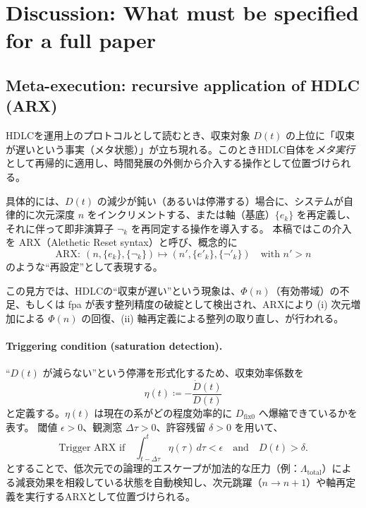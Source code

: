 \documentclass[12pt,a4paper]{article}
\newcommand{\dfix}{D_{\text{fix0}}}
\begin{document}
\section{Discussion: What must be specified for a full paper}
\subsection{Meta-execution: recursive application of HDLC (ARX)}
HDLCを運用上のプロトコルとして読むとき、収束対象 $D(t)$ の上位に「収束が遅いという事実（メタ状態）」が立ち現れる。このときHDLC自体を\emph{メタ実行}として再帰的に適用し、時間発展の外側から介入する操作として位置づけられる。

具体的には、$D(t)$ の減少が鈍い（あるいは停滞する）場合に、システムが自律的に次元深度 $n$ をインクリメントする、または軸（基底）$\{e_k\}$ を再定義し、それに伴って即非演算子 $\neg_k$ を再同定する操作を導入する。
本稿ではこの介入を ARX（Alethetic Reset syntax）と呼び、概念的に
\begin{equation}
  \mathrm{ARX}:\ (n,\{e_k\},\{\neg_k\})\mapsto (n',\{e'_k\},\{\neg'_k\})\quad \text{with } n'>n
\end{equation}
のような``再設定''として表現する。

この見方では、HDLCの``収束が遅い''という現象は、$\Phi(n)$（有効帯域）の不足、もしくは fpa が表す整列精度の破綻として検出され、ARXにより (i) 次元増加による $\Phi(n)$ の回復、(ii) 軸再定義による整列の取り直し、が行われる。

\paragraph{Triggering condition (saturation detection).}
``$D(t)$ が減らない''という停滞を形式化するため、収束効率係数を
\begin{equation}
  \eta(t) \coloneqq -\frac{\dot D(t)}{D(t)}
  \label{eq:eta}
\end{equation}
と定義する。$\eta(t)$ は現在の系がどの程度効率的に $\dfix$ へ爆縮できているかを表す。
閾値 $\epsilon>0$、観測窓 $\Delta\tau>0$、許容残留 $\delta>0$ を用いて、
\begin{equation}
  \text{Trigger ARX if}\quad \int_{t-\Delta\tau}^{t} \eta(\tau)\,d\tau < \epsilon \quad \text{and}\quad D(t)>\delta.
  \label{eq:arx_trigger}
\end{equation}
とすることで、低次元での論理的エスケープが加法的な圧力（例：$\Lambda_{\mathrm{total}}$）による減衰効果を相殺している状態を自動検知し、次元跳躍（$n\to n+1$）や軸再定義を実行するARXとして位置づけられる。
\end{document}
